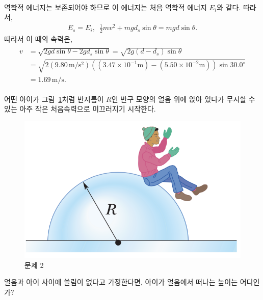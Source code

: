 \documentclass[floatfix,nofootinbib,superscriptaddress,fleqn]{revtex4-2}
\begin{document}
\begin{itemize}
\begin{align}
  \end{align}
  역학적 에너지는 보존되어야 하므로 이 에너지는 처음 역학적 에너지 $E_i$와 같다. 따라서,
  \begin{align}
    E_s = E_i,\,\,\,\frac{1}{2}mv^2+mgd_s\sin{\theta} = mgd\sin{\theta}.
  \end{align}
  따라서 이 때의 속력은,
  \begin{align}
    \begin{split}
      v &= \sqrt{2gd\sin{\theta}-2gd_s\sin{\theta}}
      = \sqrt{2g(d-d_s)\sin{\theta}}  \\
      &= \sqrt{2(9.80\,\mathrm{m/s^2})
      \left((3.47\times 10^{-1}\mathrm{m})
      -(5.50\times 10^{-2}\mathrm{m})\right)
      \sin{30.0^\circ}} \\
      &= 1.69\,\mathrm{m/s}.
    \end{split}
  \end{align}
\end{itemize}

\vspace{1cm}

어떤 아이가 그림~\ref{fig:2}처럼
반지름이 $R$인 반구 모양의 얼음 위에 앉아 있다가 무시할 수 있는 아주
작은 처음속력으로 미끄러지기 시작한다. 

\begin{figure}[ht]
  \centering
\includegraphics[scale=0.5]{Qfig9-3-20210330.png}  
  \caption{문제 2}
  \label{fig:2}
\end{figure}

얼음과 아이 사이에 쓸림이 없다고 가정한다면, 아이가 얼음에서 떠나는
높이는 어디인가?
\end{document}
